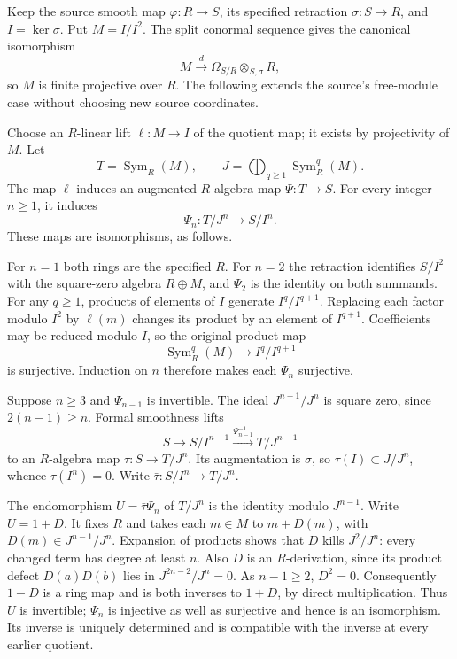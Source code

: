 Keep the source smooth map \(\varphi:R\to S\), its specified retraction \(\sigma:S\to R\), and \(I=\ker\sigma\). Put \(M=I/I^2\). The split conormal sequence gives the canonical isomorphism \[
M\xrightarrow{\ d\ }\Omega_{S/R}\otimes_{S,\sigma}R,
\] so \(M\) is finite projective over \(R\). The following extends the source's free-module case without choosing new source coordinates.

Choose an \(R\)-linear lift \(\ell:M\to I\) of the quotient map; it exists by projectivity of \(M\). Let \[
T=\operatorname{Sym}_R(M),\qquad J=\bigoplus_{q\ge1}\operatorname{Sym}_R^q(M).
\] The map \(\ell\) induces an augmented \(R\)-algebra map \(\Psi:T\to S\). For every integer \(n\ge1\), it induces \[
\Psi_n:T/J^n\longrightarrow S/I^n.
\] These maps are isomorphisms, as follows.

For \(n=1\) both rings are the specified \(R\). For \(n=2\) the retraction identifies \(S/I^2\) with the square-zero algebra \(R\oplus M\), and \(\Psi_2\) is the identity on both summands. For any \(q\ge1\), products of elements of \(I\) generate \(I^q/I^{q+1}\). Replacing each factor modulo \(I^2\) by \(\ell(m)\) changes its product by an element of \(I^{q+1}\). Coefficients may be reduced modulo \(I\), so the original product map \[
\operatorname{Sym}_R^q(M)\longrightarrow I^q/I^{q+1}
\] is surjective. Induction on \(n\) therefore makes each \(\Psi_n\) surjective.

Suppose \(n\ge3\) and \(\Psi_{n-1}\) is invertible. The ideal \(J^{n-1}/J^n\) is square zero, since \(2(n-1)\ge n\). Formal smoothness lifts \[
S\longrightarrow S/I^{n-1}\xrightarrow{\Psi_{n-1}^{-1}}T/J^{n-1}
\] to an \(R\)-algebra map \(\tau:S\to T/J^n\). Its augmentation is \(\sigma\), so \(\tau(I)\subset J/J^n\), whence \(\tau(I^n)=0\). Write \(\bar\tau:S/I^n\to T/J^n\).

The endomorphism \(U=\bar\tau\Psi_n\) of \(T/J^n\) is the identity modulo \(J^{n-1}\). Write \(U=1+D\). It fixes \(R\) and takes each \(m\in M\) to \(m+D(m)\), with \(D(m)\in J^{n-1}/J^n\). Expansion of products shows that \(D\) kills \(J^2/J^n\): every changed term has degree at least \(n\). Also \(D\) is an \(R\)-derivation, since its product defect \(D(a)D(b)\) lies in \(J^{2n-2}/J^n=0\). As \(n-1\ge2\), \(D^2=0\). Consequently \(1-D\) is a ring map and is both inverses to \(1+D\), by direct multiplication. Thus \(U\) is invertible; \(\Psi_n\) is injective as well as surjective and hence is an isomorphism. Its inverse is uniquely determined and is compatible with the inverse at every earlier quotient.

